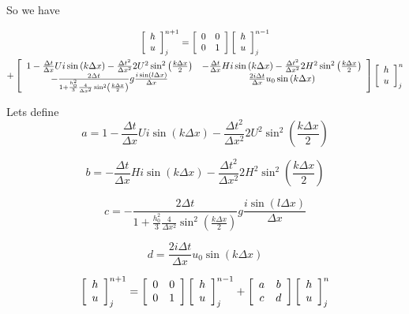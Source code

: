 \documentclass[12pt]{article}
\begin{document}
So we have

\begin{multline}
\left[\begin{array}{c}
h \\
u
\end{array} \right]^{n+1}_j = \left[\begin{array}{c c}
0 & 0 \\
0 & 1
\end{array} \right]\left[\begin{array}{c}
h \\
u
\end{array} \right]^{n-1}_j  \\+\left[\begin{array}{c c}
1 - \frac{\Delta t}{\Delta x}Ui\sin\left(k\Delta x\right)  - \frac{\Delta t^2}{\Delta x^2}2U^2\sin^2\left(\frac{k\Delta x}{2}\right) & - \frac{\Delta t}{\Delta x}Hi\sin\left(k\Delta x\right)  -\frac{\Delta t^2}{\Delta x^2}2H^2\sin^2\left(\frac{k\Delta x}{2}\right) \\
-\frac{2 \Delta t}{1 +\frac{h_0^2}{3}\frac{4}{\Delta x^2}\sin^2\left(\frac{k\Delta x}{2}\right) }g\frac{i \sin\left(l \Delta x\right)}{\Delta x} & \frac{2i\Delta t}{\Delta x}u_0\sin\left(k \Delta x\right)
\end{array} \right]  \left[\begin{array}{c}
h \\
u
\end{array} \right]^{n}_j 
\end{multline}

Lets define 
$$a = 1 - \frac{\Delta t}{\Delta x}Ui\sin\left(k\Delta x\right)  - \frac{\Delta t^2}{\Delta x^2}2U^2\sin^2\left(\frac{k\Delta x}{2}\right)$$

$$b = - \frac{\Delta t}{\Delta x}Hi\sin\left(k\Delta x\right)  - \frac{\Delta t^2}{\Delta x^2}2H^2\sin^2\left(\frac{k\Delta x}{2}\right)$$

$$c = -\frac{2 \Delta t}{1 +\frac{h_0^2}{3}\frac{4}{\Delta x^2}\sin^2\left(\frac{k\Delta x}{2}\right) }g\frac{i \sin\left(l \Delta x\right)}{\Delta x}$$

$$d = \frac{2i\Delta t}{\Delta x}u_0\sin\left(k \Delta x\right)$$


\begin{multline}
\left[\begin{array}{c}
h \\
u
\end{array} \right]^{n+1}_j = \left[\begin{array}{c c}
0 & 0 \\
0 & 1
\end{array} \right]\left[\begin{array}{c}
h \\
u
\end{array} \right]^{n-1}_j  +\left[\begin{array}{c c}
a & b \\
c & d
\end{array} \right]  \left[\begin{array}{c}
h \\
u
\end{array} \right]^{n}_j 
\end{multline}
\end{document}
